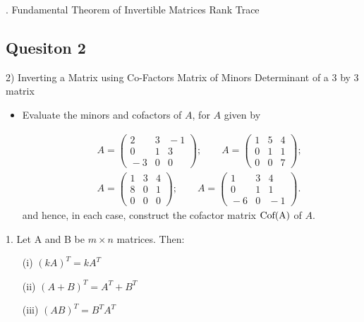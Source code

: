 \documentclass[12pt,a4paper]{article}
\begin{document}

.
Fundamental Theorem of Invertible Matrices
Rank
Trace

\subsection*{Quesiton 2}

2) Inverting a Matrix using Co-Factors
	Matrix of Minors
	Determinant of a 3 by 3 matrix

\begin{itemize}	
\item Evaluate the  minors and cofactors of $A$, for $A$ given by

\begin{eqnarray*}
& &\!\!\!\!\!\!\!\!A=\left( \begin{array}{ccc}
2 & 3 & \!\!\!\!-1\\
0 & 1 & 3\\
\!\!\!\!-3 & 0 & 0\end{array}\right);\qquad A=\left( \begin{array}{ccc}
1 & 5 & 4\\
0 & 1 & 1\\
0 & 0 & 7
\end{array} \right);\\
& &\!\!\!\!\!\!\!\!A=\left( \begin{array}{ccc}
1 & 3 & 4\\
8 & 0 & 1\\
0 & 0 & 0\end{array}\right);\qquad A=\left( \begin{array}{ccc}
1 & 3 & 4\\
0 & 1 & 1\\
\!\!\!\!-6 & 0 & \!\!\!\!-1
\end{array} \right).
\end{eqnarray*}
and hence, in each case, construct the cofactor matrix $\textnormal{Cof(A)}$ of $A$.
\end{itemize}

1. Let A and B be $m \times n$ matrices. Then:

\begin{itemize}
\item[(i)] $(kA)^T = kA^T$
\item[(ii)] $(A+B)^T = A^T + B^T$
\item[(iii)] $(AB)^T = B^TA^T$
\end{itemize}
\end{document}
